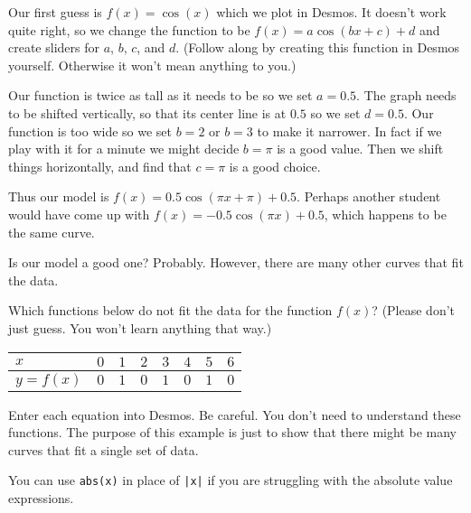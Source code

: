 \documentclass{ximera}
\begin{document}
Our first guess is $f(x)=\cos(x)$ which we plot in Desmos. It doesn't work quite right, so we change the function to be $f(x)=a\cos(bx+c)+d$ and create sliders for $a$, $b$, $c$, and $d$. (Follow along by creating this function in Desmos yourself. Otherwise it won't mean anything to you.)


Our function is twice as tall as it needs to be so we set $a=0.5$. The graph needs to be shifted vertically, so that its center line is at $0.5$ so we set $d=0.5$. Our function is too wide so we set $b=2$ or $b=3$ to make it narrower. In fact if we play with it for a minute we might decide $b=\pi$ is a good value. Then we shift things horizontally, and find that $c=\pi$ is a good choice.

Thus our model is $f(x)=0.5\cos(\pi x+\pi)+0.5$. Perhaps another student would have come up with $f(x)=-0.5\cos(\pi x)+0.5$, which happens to be the same curve. 

Is our model a good one? Probably. However, there are many other curves that fit the data.

\begin{question}
Which functions below do not fit the data for the function $f(x)$? (Please don't just guess. You won't learn anything that way.)

\begin{center} 
    \begin{tabular}{llllllll}
    $x$  & $0$ & $1$ & $2$ & $3$ & $4$ & $5$ & $6$ \\ \hline
    $y=f(x)$ & $0$ & $1$ & $0$ & $1$ & $0$ & $1$ & $0$ \\
    \end{tabular}
\end{center}

    \begin{multipleChoice}
    \end{multipleChoice}
    \begin{hint}
    Enter each equation into Desmos. Be careful. You don't need to understand these functions. The purpose of this example is just to show that there might be many curves that fit a single set of data.
    \end{hint}
    \begin{hint}
    You can use \verb|abs(x)| in place of \verb+|x|+ if you are struggling with the absolute value expressions. 
    \end{hint}

\end{question}
\end{document}
